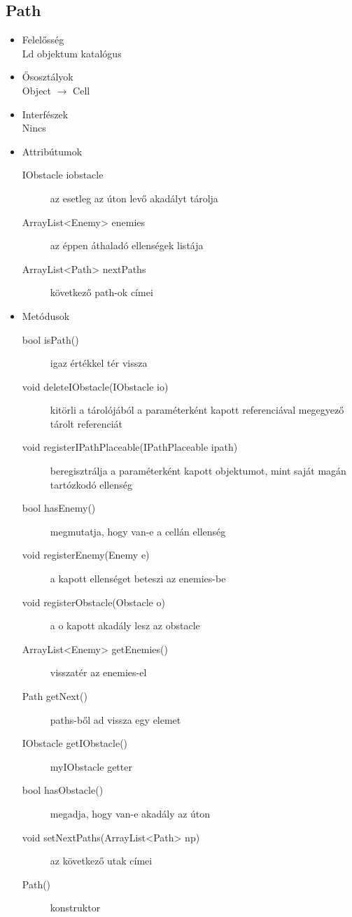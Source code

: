 \subsection{Path}
\begin{itemize}
\item Felelősség\\
Ld objektum katalógus
\item Ősosztályok\\
Object $\rightarrow$ Cell
\item Interfészek\\
Nincs
\item Attribútumok\\
	\begin{description}
		\item[IObstacle iobstacle] az esetleg az úton levő akadályt tárolja
		\item[ArrayList<Enemy> enemies] az éppen áthaladó ellenségek listája
		\item[ArrayList<Path> nextPaths] következő path-ok címei

		
	\end{description}
\item Metódusok\\
	\begin{description}
		\item[bool isPath()] igaz értékkel tér vissza
		\item[void deleteIObstacle(IObstacle io)] kitörli a tárolójából a paraméterként kapott referenciával megegyező tárolt referenciát
		\item[void registerIPathPlaceable(IPathPlaceable ipath)] beregisztrálja a paraméterként kapott objektumot, mint saját magán tartózkodó ellenség
		\item[bool hasEnemy()] megmutatja, hogy van-e a cellán ellenség
		\item[void registerEnemy(Enemy e)] a kapott ellenséget beteszi az enemies-be
		\item[void registerObstacle(Obstacle o)] a o kapott akadály lesz az obstacle
		\item[ArrayList<Enemy> getEnemies()] visszatér az enemies-el
		\item[Path getNext()] paths-ből ad vissza egy elemet
		\item[IObstacle getIObstacle()] myIObstacle getter
		\item[bool hasObstacle()] megadja, hogy van-e akadály az úton
		\item[void setNextPaths(ArrayList<Path> np)] az következő utak címei
		\item[Path()] konstruktor
		
		
	\end{description}
\end{itemize}

